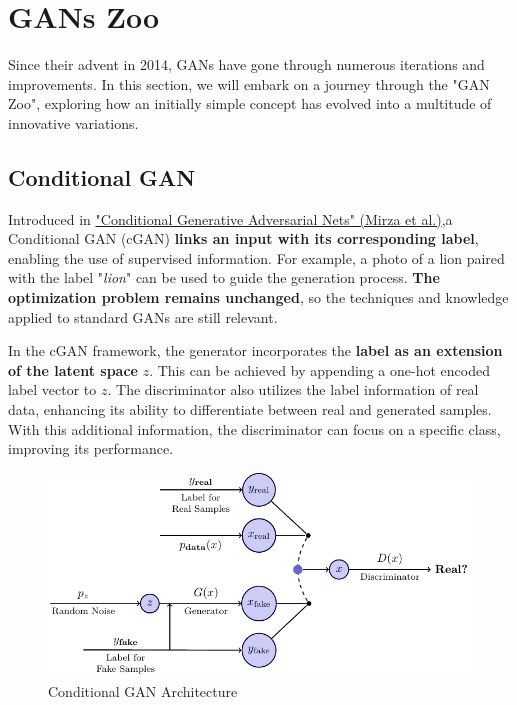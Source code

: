 \section{GANs Zoo}
Since their advent in 2014, GANs have gone through numerous iterations and improvements. In this section, we will embark on a journey through the "GAN Zoo", exploring how an initially simple concept has evolved into a multitude of innovative variations. 

\subsection{Conditional GAN}

Introduced in \href{https://arxiv.org/pdf/1411.1784}{"Conditional Generative Adversarial Nets" (Mirza et al.)},a Conditional GAN (cGAN) \textbf{links an input with its corresponding label}, enabling the use of supervised information. For example, a photo of a lion paired with the label "\textit{lion}" can be used to guide the generation process. \textbf{The optimization problem remains unchanged}, so the techniques and knowledge applied to standard GANs are still relevant.

In the cGAN framework, the generator incorporates the \textbf{label as an extension of the latent space} \( z \). This can be achieved by appending a one-hot encoded label vector to \( z \). The discriminator also utilizes the label information of real data, enhancing its ability to differentiate between real and generated samples. With this additional information, the discriminator can focus on a specific class, improving its performance.

\begin{figure}[!htbp]
    \centering
    \includegraphics[width=\linewidth]{tikz/chapter9 - Conditional GAN.pdf}
    \caption{Conditional GAN Architecture}
\end{figure}


